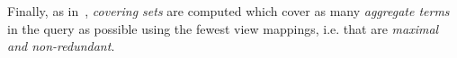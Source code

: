 \begin{example}


\end{example}


Finally, as in~\cite{wu2018data}, {\em covering sets} are computed %
which cover as many {\em aggregate terms} in the query as possible using the fewest view mappings, i.e. that are \textit{maximal and non-redundant}.

